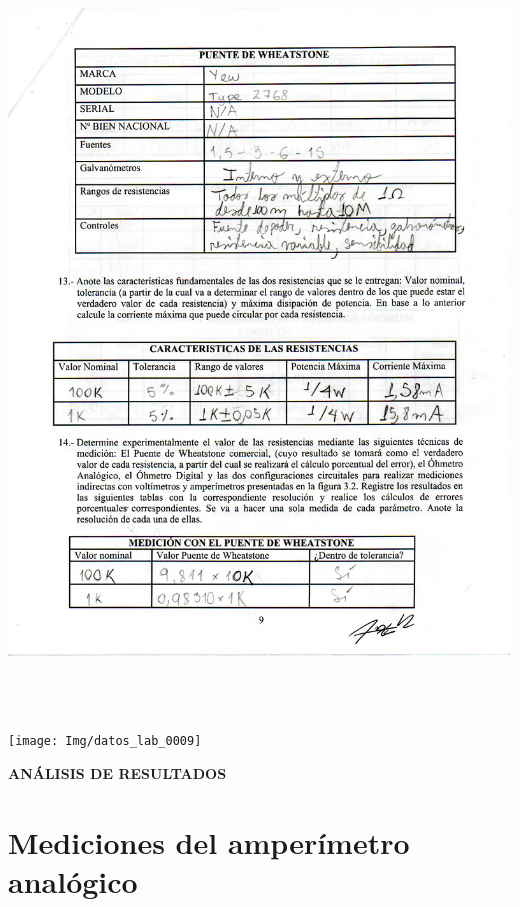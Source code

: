 \documentclass[12pt]{article}
\begin{document}
	\begin{center}
		\includegraphics[width=16cm,height=20cm]{Img/datos_lab_0008}
	\end{center}

	\begin{center}
		\texttt{[image: Img/datos\_lab\_0009]}
	\end{center}


	\newpage
	
	\begin{center}
		\textbf{\large ANÁLISIS DE RESULTADOS}\\
	\end{center}
	
	\section{Mediciones del amperímetro analógico}
	
\end{document}
